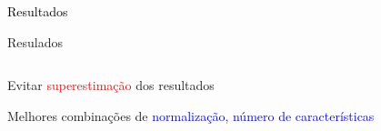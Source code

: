 \begin{transitionframe}
	\begin{center}
		{ \Huge \textcolor{black}{Resultados}}
	\end{center}
\end{transitionframe}

\begin{frame}{Resulados}
\begin{columns}[T] %
	\begin{column}{.38\textwidth}
		\begin{wideitemize}
			\item Evitar \textcolor{red}{superestimação} dos resultados
			\item Melhores combinações de \textcolor{blue}{normalização}, \textcolor{blue}{número de características}
		\end{wideitemize}
	\end{column}%
	\hfill%
	\begin{column}{.58\textwidth}
	\end{column}%
\end{columns}
\end{frame}

